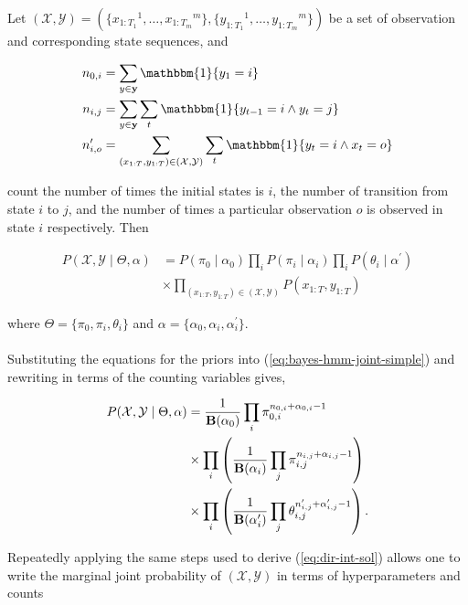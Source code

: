 \documentclass[12pt]{report}
\newcommand{\p}[0]{\prime}
\newcommand{\1}[0]{\mathbbm{1}}
\newcommand{\Bf}[0]{\text{\textbf{B}}}
\newcommand{\seq}[3]{\ensuremath{#1_{{#2}:{#3}}}}
\begin{document}
Let $(\mathcal{X}, \mathcal{Y}) = (\{\seq{x}{1}{T_1}^1, \ldots, \seq{x}{1}{T_m}^m\},
\{\seq{y}{1}{T_1}^1, \ldots, \seq{y}{1}{T_m}^m\})$ be a set of
observation and corresponding state sequences, and

\begin{align*}
    n_{0, i} &= \sum_{y \in \mathbf{y}} \1\{y_1 = i\} \\
    n_{i, j} &= \sum_{y \in \mathbf{y}} \sum_{t} \1\{y_{t-1} = i \wedge y_t = j\} \\
    n_{i, o}^\p &= \sum_{(\seq{x}{1}{T},\seq{y}{1}{T}) \in (\mathcal{X},\mathcal{Y})} \sum_{t} \1\{y_t = i \wedge x_t = o\} \\
\end{align*}

count the number of times the initial states is $i$, the number of transition from state $i$ to $j$,
and the number of times a particular observation $o$ is observed in state $i$ respectively. Then

\begin{align}  \label{eq:bayes-hmm-joint-simple}
 P(\mathcal{X}, \mathcal{Y} \mid \Theta, \alpha)
 &=  P(\pi_0 \mid \alpha_0) \prod_i P(\pi_i \mid \alpha_i) \prod_i P(\theta_i \mid \alpha^\prime) \nonumber\\
 & \times \prod_{(\seq{x}{1}{T},\seq{y}{1}{T}) \in (\mathcal{X},\mathcal{Y})} P(\seq{x}{1}{T},\seq{y}{1}{T})
\end{align}

where $\Theta = \{\pi_0, \pi_i, \theta_i\}$ and $\alpha = \{\alpha_0, \alpha_i, \alpha_i^\prime\}$.
\\\\
Substituting the equations for the priors into (\ref{eq:bayes-hmm-joint-simple})
and rewriting in terms of the counting variables gives,

\begin{align} \label{eq:bayes-hmm-joint-full}
    P(\mathcal{X}, \mathcal{Y} \mid \Theta, \alpha)
    &= \frac{1}{\Bf(\alpha_0)} \prod_{i} \pi_{0,i}^{n_{0,i} + \alpha_{0,i} - 1} \nonumber \\
    & \times \prod_i \left(\frac{1}{\Bf(\alpha_i)} \prod_{j} \pi_{i,j}^{n_{i,j} + \alpha_{i,j} - 1}\right) \nonumber \\
    & \times \prod_i \left(\frac{1}{\Bf(\alpha_i^\prime)} \prod_{j} \theta_{i,j}^{n_{i,j}^\prime + \alpha_{i,j}^\prime - 1}\right).
\end{align}

Repeatedly applying the same steps used to derive (\ref{eq:dir-int-sol})
allows one to write the marginal joint probability of $(\mathcal{X}, \mathcal{Y})$
in terms of hyperparameters and counts
\end{document}

